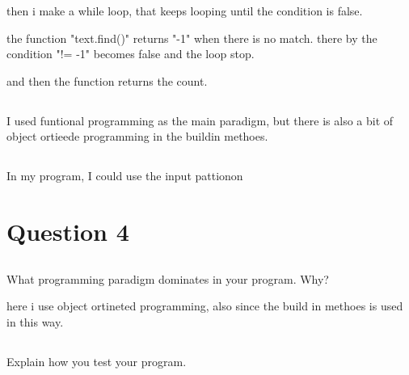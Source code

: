 \documentclass{article}
\begin{document}
then i make a while loop, that keeps looping until the condition is false.

the function "text.find()" returns "-1" when there is no match. there by the condition "!= -1" becomes false and the loop stop. 

and then the function returns the count.




\subsection{}

I used funtional programming as the main paradigm, but there is also a bit of object ortieede programming in the buildin methoes. 


\subsection{}

In my program, I could use the input pattionon




\section{Question 4}
\subsection{}






\subsection{}

What programming paradigm dominates in your program. Why?

here i use object ortineted programming, also since the build in methoes is used in this way.




\subsection{}

Explain how you test your program.


\section{}

\subsection{}
\end{document}
